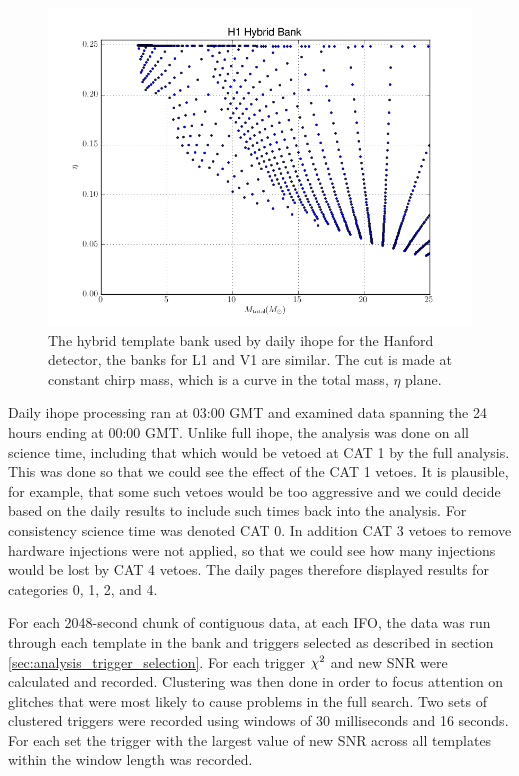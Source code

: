 \begin{figure}
  \includegraphics[width=\linewidth]{figures/detchar/hybrid_bank.png}
  \caption[The hybrid template bank used by daily ihope]{
  \label{f:daily_ihope_bank}
The hybrid template bank used by daily ihope for the Hanford detector,
the banks for L1 and V1 are similar.
The cut is made at constant chirp mass, which is
a curve in the total mass, $\eta$ plane.}
\end{figure}%

Daily ihope processing ran at 03:00 GMT and examined data spanning the
24 hours ending at 00:00 GMT.  Unlike full ihope, the analysis was
done on all science time, including that which would be vetoed at CAT
1 by the full analysis.  This was done so that we could see the effect
of the CAT 1 vetoes.  It is plausible, for example, that some such
vetoes would be too aggressive and we could decide based on the daily
results to include such times back into the analysis.  For consistency
science time was denoted CAT 0.  In addition CAT 3 vetoes to remove
hardware injections were not applied, so that we could see how many
injections would be lost by CAT 4 vetoes.  The daily pages therefore
displayed results for categories 0, 1, 2, and 4.

For each 2048-second chunk of contiguous data, at each IFO, the data
was run through each template in the bank and triggers selected as
described in section \ref{sec:analysis_trigger_selection}. For each
trigger $\chi^2$ and new SNR were calculated and recorded.  Clustering
was then done in order to focus attention on glitches that were most
likely to cause problems in the full search.  Two sets of clustered
triggers were recorded using windows of 30 milliseconds and 16
seconds.  For each set the trigger with the largest value of new SNR
across all templates within the window length was recorded.

